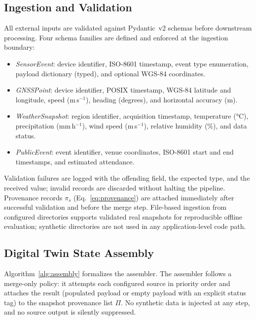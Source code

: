 
\subsection{Ingestion and Validation}

All external inputs are validated against Pydantic~v2 schemas before
downstream processing.
Four schema families are defined and enforced at the ingestion boundary:
\begin{itemize}
  \item \textit{SensorEvent}: device identifier, ISO-8601 timestamp,
        event type enumeration, payload dictionary (typed), and optional
        WGS-84 coordinates.
  \item \textit{GNSSPoint}: device identifier, POSIX timestamp, WGS-84
        latitude and longitude, speed (m\,s$^{-1}$), heading (degrees),
        and horizontal accuracy (m).
  \item \textit{WeatherSnapshot}: region identifier, acquisition timestamp,
        temperature (°C), precipitation (mm\,h$^{-1}$), wind speed
        (m\,s$^{-1}$), relative humidity (\%), and data status.
  \item \textit{PublicEvent}: event identifier, venue coordinates,
        ISO-8601 start and end timestamps, and estimated attendance.
\end{itemize}
Validation failures are logged with the offending field, the expected type,
and the received value; invalid records are discarded without halting the
pipeline.
Provenance records $\pi_s$ (Eq.~\ref{eq:provenance}) are attached immediately
after successful validation and before the merge step.
File-based ingestion from configured directories supports validated real
snapshots for reproducible offline evaluation; synthetic directories are
not used in any application-level code path.

\subsection{Digital Twin State Assembly}

Algorithm~\ref{alg:assembly} formalizes the assembler.
The assembler follows a merge-only policy: it attempts each configured source
in priority order and attaches the result (populated payload or empty payload
with an explicit status tag) to the snapshot provenance list $\Pi$.
No synthetic data is injected at any step, and no source output is
silently suppressed.

